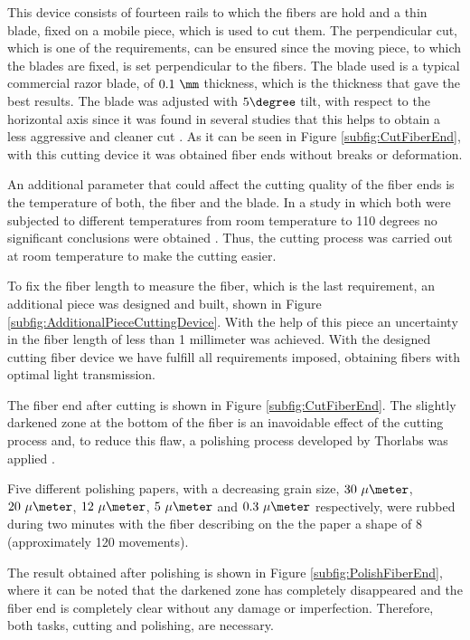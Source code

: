 This device consists of fourteen rails to which the fibers are hold and a thin blade, fixed on a mobile piece, which is used to cut them. The perpendicular cut, which is one of the requirements, can be ensured since the moving piece, to which the blades are fixed, is set perpendicular to the fibers. The blade used is a typical commercial razor blade, of $0.1~\mm$ thickness, which is the thickness that gave the best results. The blade was adjusted with $5\degree$ tilt, with respect to the horizontal axis since it was found in several studies that this helps to obtain a less aggressive and cleaner cut \cite{AngleBlade, TemperatureBlade}. As it can be seen in Figure \ref{subfig:CutFiberEnd}, with this cutting device it was obtained fiber ends without breaks or deformation.

An additional parameter that could affect the cutting quality of the fiber ends is the temperature of both, the fiber and the blade. In a study in which both were subjected to different temperatures from room temperature to 110 degrees no significant conclusions were obtained \cite{TFGAlberto}. Thus, the cutting process was carried out at room temperature to make the cutting easier.

To fix the fiber length to measure the fiber, which is the last requirement, an additional piece was designed and built, shown in Figure \ref{subfig:AdditionalPieceCuttingDevice}. With the help of this piece an uncertainty in the fiber length of less than 1 millimeter was achieved. With the designed cutting fiber device we have fulfill all requirements imposed, obtaining fibers with optimal light transmission.

The fiber end after cutting is shown in Figure \ref{subfig:CutFiberEnd}. The slightly darkened zone at the bottom of the fiber is an inavoidable effect of the cutting process and, to reduce this flaw, a polishing process developed by Thorlabs was applied \cite{DiamondThorlabs}. 

Five different polishing papers, with a decreasing grain size, $30~\mu\meter$, $20~\mu\meter$, $12~\mu\meter$, $5~\mu\meter$ and $0.3~\mu\meter$ respectively, were rubbed during two minutes with the fiber describing on the the paper a shape of 8 (approximately 120 movements). 

The result obtained after polishing is shown in Figure \ref{subfig:PolishFiberEnd}, where it can be noted that the darkened zone has completely disappeared and the fiber end is completely clear without any damage or imperfection. Therefore, both tasks, cutting and polishing,  are necessary.

